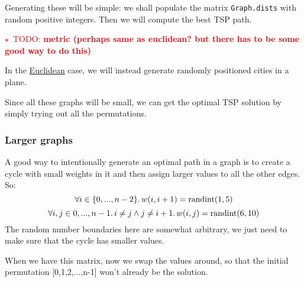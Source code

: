 \documentclass{article}
\newcommand{\todo}[1]{\textcolor{red}{$\star$~TODO: \textbf{#1}}}
\newcommand{\randint}{\operatorname{randint}}
\newcommand{\uu}[1]{\underline{#1}}
\newcommand{\py}[1]{\lstinline[language=Python]{#1}}
\begin{document}
Generating these will be simple: we shall populate the matrix
\py{Graph.dists} with random positive integers. Then we will
compute the best TSP path.

\todo{metric (perhaps same as euclidean? but there has to be some good
way to do this)}

In the \uu{Euclidean} case, we will instead generate randomly positioned
cities in a plane.

Since all these graphs will be small, we can get the optimal TSP solution by
simply trying out all the permutations.

\subsubsection{Larger graphs}

A good way to intentionally generate an optimal path in a graph is to create
a cycle with small weights in it and then assign larger values to all the other
edges. So:
\[ \forall i\in\{0,...,n-2\}\ldotp w(i,i+1)=\randint(1,5) \]
\[ \forall i,j\in{0,...,n-1}\ldotp i\ne j \wedge j\ne i+1 \ldotp
w(i,j) = \randint(6,10) \]
The random number boundaries here are somewhat arbitrary, we just need to make
sure that the cycle has smaller values.

When we have this matrix, now we swap the values around, so that the initial
permutation [0,1,2,...,n-1] won't already be the solution.
\end{document}
